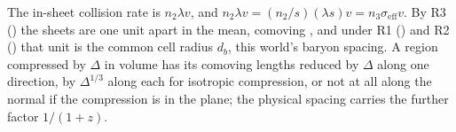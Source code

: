 The in-sheet collision rate is $n_{2}\lambda v$, and $n_{2}\lambda v = (n_{2}/s)(\lambda s)v = n_{3}\sigma_{\mathrm{eff}}v$. By R3 () the sheets are one unit apart in the mean, comoving \cite[Prem.~7.4]{ButlerT14}, and under R1 () and R2 () that unit is the common cell radius $d_{b}$, this world's baryon spacing. A region compressed by $\Delta$ in volume has its comoving lengths reduced by $\Delta$ along one direction, by $\Delta^{1/3}$ along each for isotropic compression, or not at all along the normal if the compression is in the plane; the physical spacing carries the further factor $1/(1+z)$.
